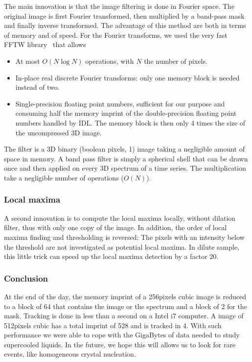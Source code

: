 The main innovation is that the image filtering is done in Fourier space. The original image is first Fourier transformed, then multiplied by a band-pass mask and finally inverse transformed. The advantage of this method are both in terms of memory and of speed. For the Fourier transforms, we used the very fast FFTW library~\citep{Frigo2005} that allows
\begin{itemize}
	\item At most $O(N\log N)$ operations, with $N$ the number of pixels. 
	\item In-place real discrete Fourier transforms: only one memory block is needed instead of two. 
	\item Single-precision floating point numbers, sufficient for our purpose and consuming half the memory imprint of the double-precision floating point numbers handled by IDL. The memory block is then only 4 times the size of the uncompressed 3D image.
\end{itemize}

The filter is a 3D binary (boolean pixels, \unit{1}{\bit}) image taking a negligible amount of space in memory. A band pass filter is simply a spherical shell that can be drawn once and then applied on every 3D spectrum of a time series. The multiplication take a negligible number of operations ($O(N)$).

\subsubsection{Local maxima}

A second innovation is to compute the local maxima locally, without dilation filter, thus with only one copy of the image. In addition, the order of local maxima finding and thresholding is reversed: The pixels with an intensity below the threshold are not investigated as potential local maxima. In dilute sample, this little trick can speed up the local maxima detection by a factor 20.

\subsubsection{Conclusion}

At the end of the day, the memory imprint of a \unit{256}{pixels} cubic image is reduced to a block of \unit{64}{\mega\byte} that contains the image or the spectrum and a block of \unit{2}{\mega\byte} for the mask. Tracking is done in less than a second on a Intel i7 computer. A image of \unit{512}{pixels} cubic has a total imprint of \unit{528}{\mega\byte} and is tracked in \unit{4}{\second}. With such performance we were able to cope with the GigaBytes of data needed to study supercooled liquids. In the future, we hope this will allows us to look for rare events, like homogeneous crystal nucleation.

